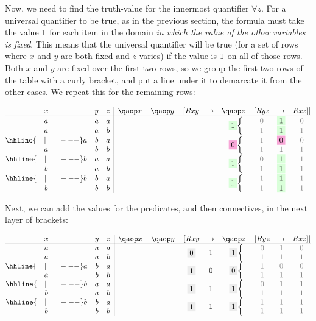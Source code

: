 \documentclass[PHIL101-Textbook.tex]{subfiles}
\begin{document}
\noindent Now, we need to find the truth-value for the innermost quantifier $\forall z$. For a universal quantifier to be true, as in the previous section, the formula must take the value $1$ for each item in the domain \emph{in which the value of the other variables is fixed}. This means that the universal quantifier will be true (for a set of rows where $x$ and $y$ are both fixed and $z$ varies) if the value is $1$ on all of those rows. Both $x$ and $y$ are fixed over the first two rows, so we group the first two rows of the table with a curly bracket, and put a line under it to demarcate it from the other cases. We repeat this for the remaining rows: 

\[
\begin{array}{@{}ccc|cccccccc@{}}
  x & y & z & \qa x & \qa y & [\atom R {xy} & \eif & \qa z & [\atom R {yz} & \eif & \atom R {xz}]]\\ \hline
  a & a & a & &&  &&\brax{2}{\TT}& \gF & \TT & \gF \\
  a & a & b & &&  &&& \gT & \TT & \gT \\
				\hhline{~~~|~~~~~---}
  a & b & a & &&  &&\brax{2}{\FF}& \gT & \FF & \gF \\
  a & b & b & &&  &&& \gT & \vT & \gT \\
				\hhline{~~~|~~~~~---}
  b & a & a & &&  &&\brax{2}{\TT}& \gF & \TT & \gT \\
  b & a & b & &&  &&& \gT & \TT & \gT \\
				\hhline{~~~|~~~~~---}
  b & b & a & &&  &&\brax{2}{\TT}& \gT & \TT & \gT \\
  b & b & b & &&  &&& \gT & \TT & \gT \\\end{array}
\]

\noindent Next, we can add the values for the predicates, and then connectives, in the next layer of brackets:

\[
\begin{array}{@{}ccc|cccccccc@{}}
  x & y & z & \qa x & \qa y & [\atom R {xy} & \eif & \qa z & [\atom R {yz} & \eif & \atom R {xz}]]\\ \hline
  a & a & a & &&\mrow{2}{\GF}&\mrow{2}{\vT}&\brax{2}{\GT}& \gF & \gT & \gF \\
  a & a & b & &&  &&& \gT & \gT & \gT \\
				\hhline{~~~|~~~~~---}
  a & b & a & &&\mrow{2}{\GT}&\mrow{2}{\vF}&\brax{2}{\GF}& \gT & \gF & \gF \\
  a & b & b & &&  &&& \gT & \gT & \gT \\
				\hhline{~~~|~~~~~---}
  b & a & a & &&\mrow{2}{\GT}&\mrow{2}{\vT}&\brax{2}{\GT}& \gF & \gT & \gT \\
  b & a & b & &&  &&& \gT & \gT & \gT \\
				\hhline{~~~|~~~~~---}
  b & b & a & &&\mrow{2}{\GT}&\mrow{2}{\vT}&\brax{2}{\GT}& \gT & \gT & \gT \\
  b & b & b & &&  &&& \gT & \gT & \gT \\\end{array}
\]
\end{document}
